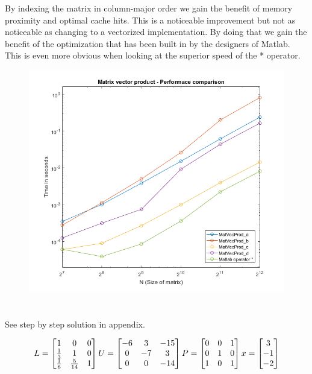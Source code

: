 \documentclass[12pt]{article}
\begin{document}
By indexing the matrix in column-major order we gain the benefit of memory proximity and optimal cache hits. This is a noticeable improvement but not as noticeable as changing to a vectorized implementation. By doing that we gain the benefit of the optimization that has been built in by the designers of Matlab. This is even more obvious when looking at the superior speed of the * operator.

\begin{figure}
	\includegraphics[width=\linewidth]{matVecProdPlot}
	\centering
	\label{fig_matVecProdPlot}
\end{figure}

\section{}

See step by step solution in appendix.

\[
L =  
\begin{bmatrix}
    1 & 0 & 0  \\
    \frac{1}{3} & 1 & 0 \\
    \frac{1}{6} & \frac{5}{14} & 1
\end{bmatrix}
\\
U =  
\begin{bmatrix}
    -6 & 3 & -15  \\
    0 & -7 & 3 \\
    0 & 0 & -14
\end{bmatrix}
\\
P =  
\begin{bmatrix}
    0 & 0 & 1 \\
    0 & 1 & 0 \\
    1 & 0 & 1
\end{bmatrix}
\\
x =  
\begin{bmatrix}
    3  \\
    -1 \\
    -2 
\end{bmatrix}
\]
\end{document}
